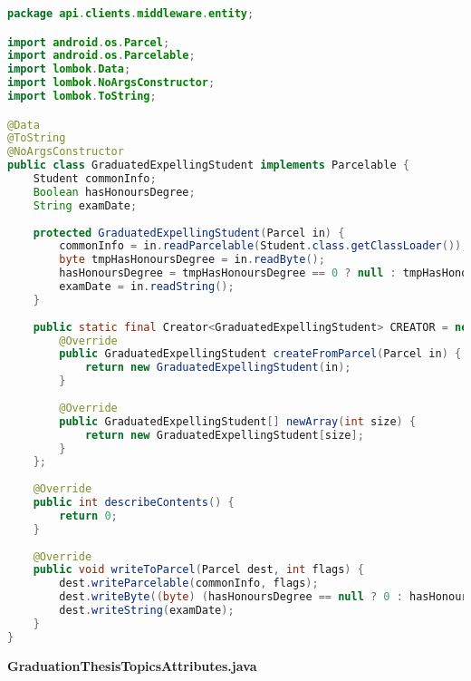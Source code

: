 \begin{lstlisting}[language=Java]
package api.clients.middleware.entity;

import android.os.Parcel;
import android.os.Parcelable;
import lombok.Data;
import lombok.NoArgsConstructor;
import lombok.ToString;

@Data
@ToString
@NoArgsConstructor
public class GraduatedExpellingStudent implements Parcelable {
	Student commonInfo;
	Boolean hasHonoursDegree;
	String examDate;
	
	protected GraduatedExpellingStudent(Parcel in) {
		commonInfo = in.readParcelable(Student.class.getClassLoader());
		byte tmpHasHonoursDegree = in.readByte();
		hasHonoursDegree = tmpHasHonoursDegree == 0 ? null : tmpHasHonoursDegree == 1;
		examDate = in.readString();
	}
	
	public static final Creator<GraduatedExpellingStudent> CREATOR = new Creator<GraduatedExpellingStudent>() {
		@Override
		public GraduatedExpellingStudent createFromParcel(Parcel in) {
			return new GraduatedExpellingStudent(in);
		}
		
		@Override
		public GraduatedExpellingStudent[] newArray(int size) {
			return new GraduatedExpellingStudent[size];
		}
	};
	
	@Override
	public int describeContents() {
		return 0;
	}
	
	@Override
	public void writeToParcel(Parcel dest, int flags) {
		dest.writeParcelable(commonInfo, flags);
		dest.writeByte((byte) (hasHonoursDegree == null ? 0 : hasHonoursDegree ? 1 : 2));
		dest.writeString(examDate);
	}
}

\end{lstlisting}
\textbf{GraduationThesisTopicsAttributes.java}
